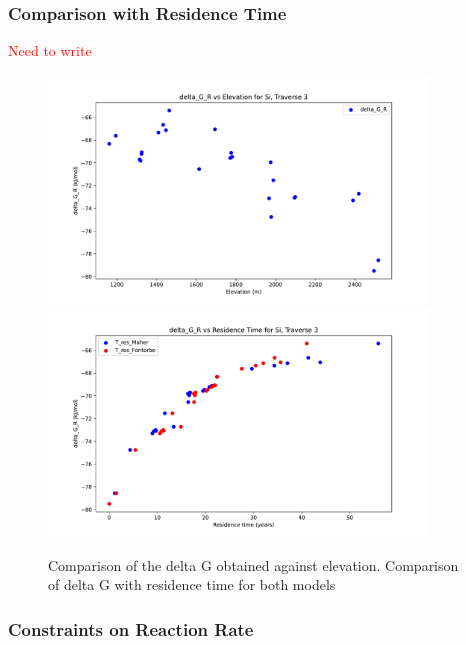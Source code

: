 \subsubsection{Comparison with Residence Time}

\textcolor{red}{Need to write }
\begin{figure}[H]
    \centering
    \includegraphics[width=0.9\textwidth]{delta_G_R_Si_comparison.pdf}
    \includegraphics[width=0.9\textwidth]{delta_G_R_Si_time.pdf}
    \caption{Comparison of the delta G obtained against elevation. Comparison of delta G with residence time for both models}
    \label{fig:discussion8}
\end{figure}

\FloatBarrier


\newpage

\subsubsection{Constraints on Reaction Rate}

